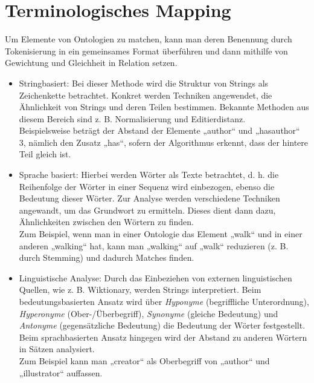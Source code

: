 	\section{Terminologisches Mapping}
	Um Elemente von Ontologien zu matchen, kann man deren Benennung durch
	Tokenisierung in ein gemeinsames Format überführen und dann mithilfe von
	Gewichtung und Gleichheit in Relation setzen.
	\begin{itemize}
		\item Stringbasiert: Bei dieser Methode wird die Struktur von
		Strings als Zeichenkette betrachtet. Konkret werden Techniken angewendet, die Ähnlichkeit
		von Strings und deren Teilen bestimmen. Bekannte Methoden aus diesem Bereich
		sind z. B. Normalisierung und Editierdistanz. \cite{EuzShv07}\\
		Beispielsweise beträgt der Abstand der Elemente „author“ und „hasauthor“ 3,
		nämlich den Zusatz „has“, sofern der Algorithmus erkennt, dass der hintere Teil gleich ist.
		\item  Sprache basiert: Hierbei werden Wörter als Texte
		betrachtet, d. h.
		die Reihenfolge der Wörter in einer Sequenz wird einbezogen, ebenso die
		Bedeutung dieser Wörter. Zur Analyse werden verschiedene Techniken angewandt,
		um das Grundwort zu ermitteln. Dieses dient dann dazu, Ähnlichkeiten zwischen
		den Wörtern zu finden.\cite{EuzShv07}\\
		Zum Beispiel, wenn man in einer Ontologie das Element „walk“ und in einer
		anderen „walking“ hat, kann man „walking“ auf „walk“ reduzieren (z. B. durch
		Stemming) und dadurch Matches finden.
		\item Linguistische Analyse: Durch das Einbeziehen von externen
		linguistischen Quellen, wie z. B. Wiktionary, werden Strings interpretiert.
		Beim bedeutungsbasierten Ansatz wird über \textit{Hyponyme} (begriffliche
		Unterordnung), \textit{Hyperonyme} (Ober-/Überbegriff), \textit{Synonyme}
		(gleiche Bedeutung) und \textit{Antonyme} (gegensätzliche Bedeutung) die
		Bedeutung der Wörter festgestellt. Beim sprachbasierten Ansatz hingegen wird
		der Abstand zu anderen Wörtern in Sätzen analysiert.\cite{EuzShv07}\\
		Zum Beispiel kann man „creator“ als Oberbegriff von „author“ und
		„illustrator“ auffassen.
	\end{itemize}
	
